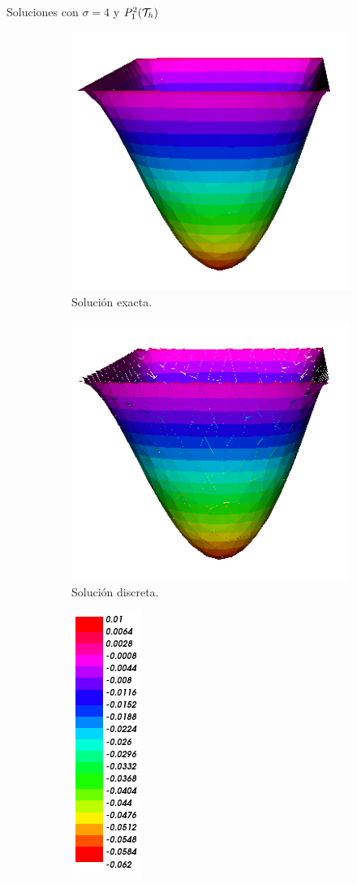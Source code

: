 \begin{frame}{Soluciones con $\sigma=4$ y $\relax{P}^2_1(\mathcal{T}_h)$}
\begin{figure}[h!]
\begin{subfigure}[b]{0.215\textwidth}
				\includegraphics[scale=0.16]{img/Difusion/Recortes/steady_diffusion_exact_n_16.png}
				\caption{Solución exacta.}
			\end{subfigure}
			\begin{subfigure}[b]{0.215\textwidth}
				\centering
				\includegraphics[scale=0.16]{img/Difusion/Recortes/steady_diffusion_approx_n_16.png}
				\caption{Solución discreta.}
			\end{subfigure}
			\begin{subfigure}[b]{0.11\textwidth}
				\centering
				\includegraphics[scale=0.23]{img/Difusion/Recortes/steady_diffusion_values.png}

\end{subfigure}
\end{figure}
\end{frame}
